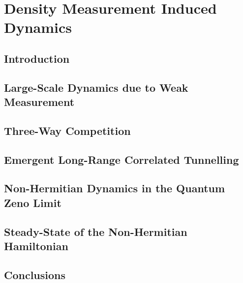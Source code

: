 
\chapter{Density Measurement Induced Dynamics}

\ifpdf
    \graphicspath{{Chapter5/Figs/Raster/}{Chapter5/Figs/PDF/}{Chapter5/Figs/}}
\else
    \graphicspath{{Chapter5/Figs/Vector/}{Chapter5/Figs/}}
\fi


\section{Introduction}

\section{Large-Scale Dynamics due to Weak Measurement}

\section{Three-Way Competition}

\section{Emergent Long-Range Correlated Tunnelling}

\section{Non-Hermitian Dynamics in the Quantum Zeno Limit}

\section{Steady-State of the Non-Hermitian Hamiltonian}

\section{Conclusions}